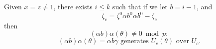 Given $x = z \neq 1$, there exists $i \leq k$ such that if we let $b = i - 1$, and
$$\zeta_c = \zeta^0 \alpha b^0 \alpha b^0 - \zeta_c$$
then
$$(\alpha b) \alpha(\theta) \neq 0 \bmod p;$$
$$(\alpha b) \alpha(\theta) = \alpha b \gamma \text{ generates } U_c(\theta) \text{ over } U_c.$$
